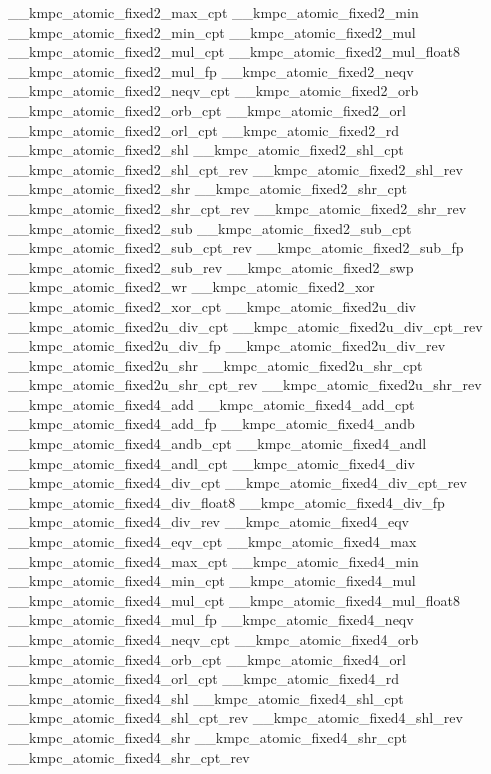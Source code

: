 \begin{DoxyCode}
\_\_kmpc\_atomic\_fixed2\_max\_cpt
\_\_kmpc\_atomic\_fixed2\_min
\_\_kmpc\_atomic\_fixed2\_min\_cpt
\_\_kmpc\_atomic\_fixed2\_mul
\_\_kmpc\_atomic\_fixed2\_mul\_cpt
\_\_kmpc\_atomic\_fixed2\_mul\_float8
\_\_kmpc\_atomic\_fixed2\_mul\_fp
\_\_kmpc\_atomic\_fixed2\_neqv
\_\_kmpc\_atomic\_fixed2\_neqv\_cpt
\_\_kmpc\_atomic\_fixed2\_orb
\_\_kmpc\_atomic\_fixed2\_orb\_cpt
\_\_kmpc\_atomic\_fixed2\_orl
\_\_kmpc\_atomic\_fixed2\_orl\_cpt
\_\_kmpc\_atomic\_fixed2\_rd
\_\_kmpc\_atomic\_fixed2\_shl
\_\_kmpc\_atomic\_fixed2\_shl\_cpt
\_\_kmpc\_atomic\_fixed2\_shl\_cpt\_rev
\_\_kmpc\_atomic\_fixed2\_shl\_rev
\_\_kmpc\_atomic\_fixed2\_shr
\_\_kmpc\_atomic\_fixed2\_shr\_cpt
\_\_kmpc\_atomic\_fixed2\_shr\_cpt\_rev
\_\_kmpc\_atomic\_fixed2\_shr\_rev
\_\_kmpc\_atomic\_fixed2\_sub
\_\_kmpc\_atomic\_fixed2\_sub\_cpt
\_\_kmpc\_atomic\_fixed2\_sub\_cpt\_rev
\_\_kmpc\_atomic\_fixed2\_sub\_fp
\_\_kmpc\_atomic\_fixed2\_sub\_rev
\_\_kmpc\_atomic\_fixed2\_swp
\_\_kmpc\_atomic\_fixed2\_wr
\_\_kmpc\_atomic\_fixed2\_xor
\_\_kmpc\_atomic\_fixed2\_xor\_cpt
\_\_kmpc\_atomic\_fixed2u\_div
\_\_kmpc\_atomic\_fixed2u\_div\_cpt
\_\_kmpc\_atomic\_fixed2u\_div\_cpt\_rev
\_\_kmpc\_atomic\_fixed2u\_div\_fp
\_\_kmpc\_atomic\_fixed2u\_div\_rev
\_\_kmpc\_atomic\_fixed2u\_shr
\_\_kmpc\_atomic\_fixed2u\_shr\_cpt
\_\_kmpc\_atomic\_fixed2u\_shr\_cpt\_rev
\_\_kmpc\_atomic\_fixed2u\_shr\_rev
\_\_kmpc\_atomic\_fixed4\_add
\_\_kmpc\_atomic\_fixed4\_add\_cpt
\_\_kmpc\_atomic\_fixed4\_add\_fp
\_\_kmpc\_atomic\_fixed4\_andb
\_\_kmpc\_atomic\_fixed4\_andb\_cpt
\_\_kmpc\_atomic\_fixed4\_andl
\_\_kmpc\_atomic\_fixed4\_andl\_cpt
\_\_kmpc\_atomic\_fixed4\_div
\_\_kmpc\_atomic\_fixed4\_div\_cpt
\_\_kmpc\_atomic\_fixed4\_div\_cpt\_rev
\_\_kmpc\_atomic\_fixed4\_div\_float8
\_\_kmpc\_atomic\_fixed4\_div\_fp
\_\_kmpc\_atomic\_fixed4\_div\_rev
\_\_kmpc\_atomic\_fixed4\_eqv
\_\_kmpc\_atomic\_fixed4\_eqv\_cpt
\_\_kmpc\_atomic\_fixed4\_max
\_\_kmpc\_atomic\_fixed4\_max\_cpt
\_\_kmpc\_atomic\_fixed4\_min
\_\_kmpc\_atomic\_fixed4\_min\_cpt
\_\_kmpc\_atomic\_fixed4\_mul
\_\_kmpc\_atomic\_fixed4\_mul\_cpt
\_\_kmpc\_atomic\_fixed4\_mul\_float8
\_\_kmpc\_atomic\_fixed4\_mul\_fp
\_\_kmpc\_atomic\_fixed4\_neqv
\_\_kmpc\_atomic\_fixed4\_neqv\_cpt
\_\_kmpc\_atomic\_fixed4\_orb
\_\_kmpc\_atomic\_fixed4\_orb\_cpt
\_\_kmpc\_atomic\_fixed4\_orl
\_\_kmpc\_atomic\_fixed4\_orl\_cpt
\_\_kmpc\_atomic\_fixed4\_rd
\_\_kmpc\_atomic\_fixed4\_shl
\_\_kmpc\_atomic\_fixed4\_shl\_cpt
\_\_kmpc\_atomic\_fixed4\_shl\_cpt\_rev
\_\_kmpc\_atomic\_fixed4\_shl\_rev
\_\_kmpc\_atomic\_fixed4\_shr
\_\_kmpc\_atomic\_fixed4\_shr\_cpt
\_\_kmpc\_atomic\_fixed4\_shr\_cpt\_rev

\end{DoxyCode}
